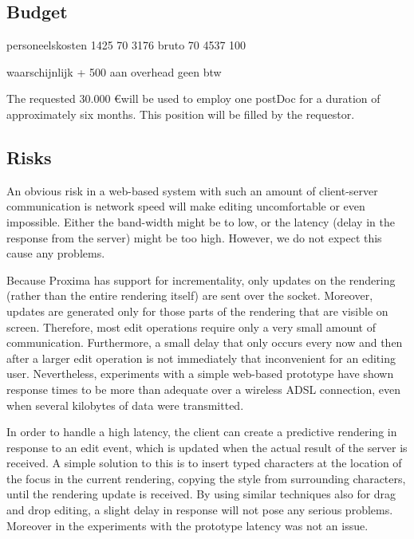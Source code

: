 \documentclass[10pt]{article}
\begin{document}
\subsection{Budget}

\bc
personeelskosten
1425       70%
3176 bruto 70%
4537       100%

waarschijnlijk + 500 aan overhead
geen btw
\ec

The requested 30.000 \euro will be used to employ one postDoc for a duration of approximately six months. This position will be filled by the requestor.

\subsection{Risks}


An obvious risk in a web-based system with such an amount of client-server communication is network speed will make editing uncomfortable or even impossible. Either the band-width might be to low, or the latency (delay in the response from the server) might be too high. However, we do not expect this cause any problems.

Because Proxima has support for incrementality, only updates on the rendering (rather than the entire rendering itself) are sent over the socket. Moreover, updates are generated only for those parts of the rendering that are visible on screen. Therefore, most edit operations require only a very small amount of communication. Furthermore, a small delay that only occurs every now and then after a larger edit operation is not immediately that inconvenient for an editing user. Nevertheless, experiments with a simple web-based prototype have shown response times to be more than adequate over a wireless ADSL connection, even when several kilobytes of data were transmitted. 

In order to handle a high latency, the client can create a predictive rendering in response to an edit event, which is updated when the actual result of the server is received. A simple solution to this is to insert typed characters at the location of the focus in the current rendering, copying the style from surrounding characters, until the rendering update is received. By using similar techniques also for drag and drop editing, a slight delay in response will not pose any serious problems. Moreover in the experiments with the prototype latency was not an issue.
\end{document}
